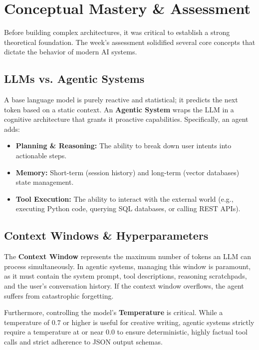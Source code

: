 \documentclass[12pt, a4paper]{article}
\begin{document}
\section{Conceptual Mastery \& Assessment}
Before building complex architectures, it was critical to establish a strong theoretical foundation. The week's assessment solidified several core concepts that dictate the behavior of modern AI systems.

\subsection{LLMs vs. Agentic Systems}
A base language model is purely reactive and statistical; it predicts the next token based on a static context. An \textbf{Agentic System} wraps the LLM in a cognitive architecture that grants it proactive capabilities. Specifically, an agent adds:
\begin{itemize}[label=\textcolor{secondary}{$\bullet$}]
    \item \textbf{Planning \& Reasoning:} The ability to break down user intents into actionable steps.
    \item \textbf{Memory:} Short-term (session history) and long-term (vector databases) state management.
    \item \textbf{Tool Execution:} The ability to interact with the external world (e.g., executing Python code, querying SQL databases, or calling REST APIs).
\end{itemize}

\subsection{Context Windows \& Hyperparameters}
The \textbf{Context Window} represents the maximum number of tokens an LLM can process simultaneously. In agentic systems, managing this window is paramount, as it must contain the system prompt, tool descriptions, reasoning scratchpads, and the user's conversation history. If the context window overflows, the agent suffers from catastrophic forgetting. 

Furthermore, controlling the model's \textbf{Temperature} is critical. While a temperature of $0.7$ or higher is useful for creative writing, agentic systems strictly require a temperature at or near $0.0$ to ensure deterministic, highly factual tool calls and strict adherence to JSON output schemas.

\newpage
\end{document}
